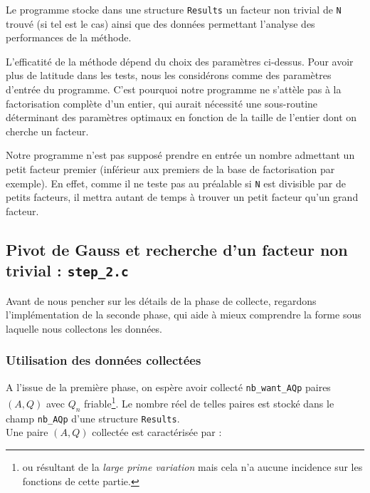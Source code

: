 Le programme stocke dans une structure \texttt{Results} un facteur non trivial
de \texttt{N} trouvé (si tel est le cas) ainsi que des données permettant 
l'analyse des performances de la méthode.  

\begin{remarque}
L'efficatité de la méthode dépend du choix des paramètres ci-dessus. Pour avoir
plus de latitude dans les tests, nous les considérons comme des paramètres 
d'entrée du programme. C'est pourquoi notre programme ne s'attèle pas à la
factorisation complète d'un entier, qui aurait nécessité une sous-routine 
déterminant des paramètres optimaux en fonction de la taille de l'entier 
dont on cherche un facteur. 
   
\end{remarque}

\begin{remarque}
Notre programme n'est pas supposé prendre en entrée un nombre admettant un petit
facteur premier (inférieur aux premiers de la base de factorisation par exemple).
En effet, comme il ne teste pas au préalable si \texttt{N} est divisible par de 
petits facteurs, il mettra autant de temps à trouver un petit facteur qu'un
grand facteur.
\end{remarque}

\subsection{Pivot de Gauss et recherche d'un facteur non trivial
            : \texttt{step\_2.c}}

Avant de nous pencher sur les détails de la phase de collecte, regardons 
l'implémentation de la seconde phase, qui aide à mieux comprendre la 
forme sous laquelle nous collectons les données.

\subsubsection{Utilisation des données collectées}
A l'issue de la première
phase, on espère avoir collecté \texttt{nb\_want\_AQp} paires $(A,Q)$ avec
$Q_n$ friable\footnote{ou résultant de la \textit{large prime variation} mais 
cela n'a aucune incidence sur les fonctions de cette partie.}. Le nombre
réel de telles paires est stocké dans le champ \texttt{nb\_AQp} d'une structure
\texttt{Results}.\\

Une paire $(A,Q)$ collectée est caractérisée par :

